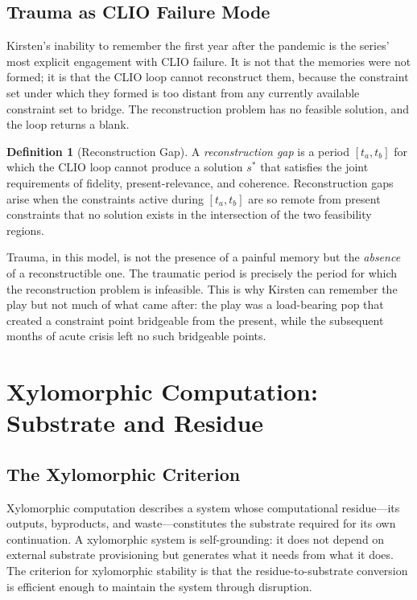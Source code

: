 \documentclass[12pt, oneside]{article}
\theoremstyle{plain}
\theoremstyle{definition}
\newtheorem{definition}[theorem]{Definition}
\theoremstyle{remark}
\begin{document}
\subsection{Trauma as CLIO Failure Mode}

Kirsten's inability to remember the first year after the pandemic
is the series' most explicit engagement with CLIO failure. It is
not that the memories were not formed; it is that the CLIO loop
cannot reconstruct them, because the constraint set under which
they formed is too distant from any currently available constraint
set to bridge. The reconstruction problem has no feasible solution,
and the loop returns a blank.

\begin{definition}[Reconstruction Gap]
A \emph{reconstruction gap} is a period $[t_a, t_b]$ for which
the CLIO loop cannot produce a solution $s^*$ that satisfies the
joint requirements of fidelity, present-relevance, and coherence.
Reconstruction gaps arise when the constraints active during
$[t_a, t_b]$ are so remote from present constraints that no
solution exists in the intersection of the two feasibility regions.
\end{definition}

Trauma, in this model, is not the presence of a painful memory but
the \emph{absence} of a reconstructible one. The traumatic period
is precisely the period for which the reconstruction problem is
infeasible. This is why Kirsten can remember the play but not much
of what came after: the play was a load-bearing pop that created a
constraint point bridgeable from the present, while the subsequent
months of acute crisis left no such bridgeable points.

\section{Xylomorphic Computation: Substrate and Residue}

\subsection{The Xylomorphic Criterion}

Xylomorphic computation describes a system whose computational
residue---its outputs, byproducts, and waste---constitutes the
substrate required for its own continuation. A xylomorphic system
is self-grounding: it does not depend on external substrate
provisioning but generates what it needs from what it does. The
criterion for xylomorphic stability is that the residue-to-substrate
conversion is efficient enough to maintain the system through
disruption.
\end{document}

